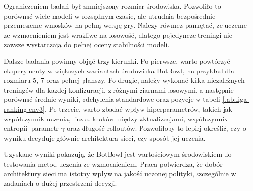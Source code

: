 Ograniczeniem badań był zmniejszony rozmiar środowiska. Pozwoliło to porównać wiele modeli w rozsądnym czasie, ale utrudnia bezpośrednie przeniesienie wniosków na pełną wersję gry. Należy również pamiętać, że uczenie ze wzmocnieniem jest wrażliwe na losowość, dlatego pojedyncze treningi nie zawsze wystarczają do pełnej oceny stabilności modeli.

Dalsze badania powinny objąć trzy kierunki. Po pierwsze, warto powtórzyć eksperymenty w większych wariantach środowiska BotBowl, na przykład dla rozmiaru 5, 7 oraz pełnej planszy. Po drugie, należy wykonać kilka niezależnych treningów dla każdej konfiguracji, z różnymi ziarnami losowymi, a następnie porównać średnie wyniki, odchylenia standardowe oraz pozycje w tabeli \ref{tab:liga-ranking-env3}. Po trzecie, warto zbadać wpływ hiperparametrów, takich jak współczynnik uczenia, liczba kroków między aktualizacjami, współczynnik entropii, parametr $\gamma$ oraz długość rolloutów. Pozwoliłoby to lepiej określić, czy o wyniku decyduje głównie architektura sieci, czy sposób jej uczenia.

Uzyskane wyniki pokazują, że BotBowl jest wartościowym środowiskiem do testowania metod uczenia ze wzmocnieniem. Praca potwierdza, że dobór architektury sieci ma istotny wpływ na jakość uczonej polityki, szczególnie w zadaniach o dużej przestrzeni decyzji.
